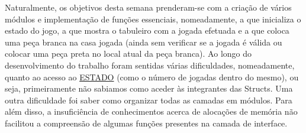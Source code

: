 
\begin{DoxyItemize}
\item Naturalmente, os objetivos desta semana prenderam-\/se com a criação de vários módulos e implementação de funções essenciais, nomeadamente, a que inicializa o estado do jogo, a que mostra o tabuleiro com a jogada efetuada e a que coloca uma peça branca na casa jogada (ainda sem verificar se a jogada é válida ou colocar uma peça preta no local atual da peça branca). Ao longo do desenvolvimento do trabalho foram sentidas várias dificuldades, nomeadamente, quanto ao acesso ao \hyperlink{structESTADO}{E\+S\+T\+A\+DO} (como o número de jogadas dentro do mesmo), ou seja, primeiramente não sabiamos como aceder às integrantes das Structs. Uma outra dificuldade foi saber como organizar todas as camadas em módulos. Para além disso, a insuficiência de conhecimentos acerca de alocações de memória não facilitou a compreensão de algumas funções presentes na camada de interface. 
\end{DoxyItemize}